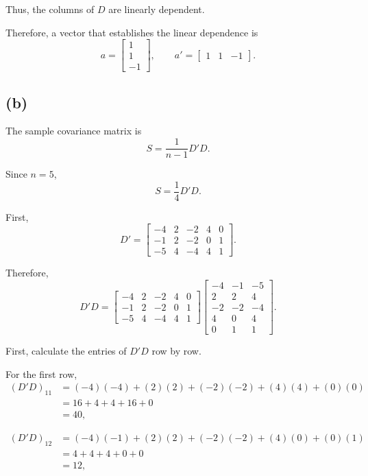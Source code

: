 \documentclass[12pt]{article}
\begin{document}
	Thus, the columns of \(D\) are linearly dependent.
	
	Therefore, a vector that establishes the linear dependence is
	\[
	\boxed{
		a=
		\begin{bmatrix}
			1\\1\\-1
	\end{bmatrix}},
	\qquad
	\boxed{
		a'=
		\begin{bmatrix}
			1&1&-1
	\end{bmatrix}}.
	\]
	
	\subsection*{(b)}
	
	The sample covariance matrix is
	\[
	S
	=
	\frac{1}{n-1}D'D.
	\]
	
	Since \(n=5\),
	\[
	S=\frac14D'D.
	\]
	
	First,
	\[
	D'
	=
	\begin{bmatrix}
		-4&2&-2&4&0\\
		-1&2&-2&0&1\\
		-5&4&-4&4&1
	\end{bmatrix}.
	\]
	
	Therefore,
	\[
	D'D
	=
	\begin{bmatrix}
		-4&2&-2&4&0\\
		-1&2&-2&0&1\\
		-5&4&-4&4&1
	\end{bmatrix}
	\begin{bmatrix}
		-4&-1&-5\\
		2&2&4\\
		-2&-2&-4\\
		4&0&4\\
		0&1&1
	\end{bmatrix}.
	\]
	
		First, calculate the entries of \(D'D\) row by row.
	
	For the first row,
	\[
	\begin{aligned}
		(D'D)_{11}
		&=(-4)(-4)+(2)(2)+(-2)(-2)+(4)(4)+(0)(0)\\
		&=16+4+4+16+0\\
		&=40,
	\end{aligned}
	\]
	
	\[
	\begin{aligned}
		(D'D)_{12}
		&=(-4)(-1)+(2)(2)+(-2)(-2)+(4)(0)+(0)(1)\\
		&=4+4+4+0+0\\
		&=12,
	\end{aligned}
	\]
	
\end{document}
